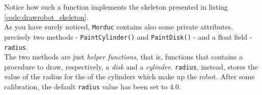 Notice how such a function implements the skeleton 
presented in listing \ref{code:drawrobot_skeleton}.
\\
As you have surely noticed, \texttt{Morduc} contains also 
some private attributes, precisely two methods - 
\texttt{PaintCylinder()} and \texttt{PaintDisk()} - and 
a float field - \texttt{radius}.
\\
The two methods are just \textit{helper functions}, that is, 
functions that contains a procedure to draw, respectively,  
a \textit{disk} and a \textit{cylinder}.
\texttt{radius}, instead, stores the value of the radius 
for the of the cylinders which make up the robot.
After some calibration, the default \texttt{radius} value 
has been set to 4.0.
